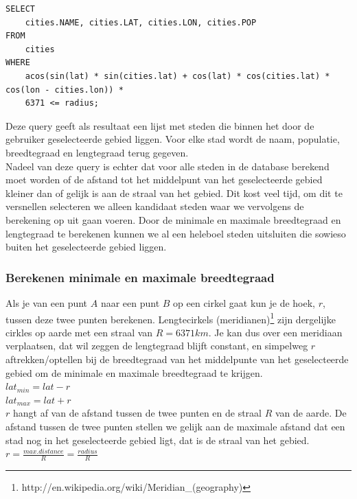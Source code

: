 \documentclass[twoside,openright]{uva-bachelor-thesis}
\begin{document}
\begin{verbatim}
SELECT
    cities.NAME, cities.LAT, cities.LON, cities.POP
FROM 
    cities 
WHERE 
    acos(sin(lat) * sin(cities.lat) + cos(lat) * cos(cities.lat) * cos(lon - cities.lon)) * 
    6371 <= radius;
\end{verbatim}
		Deze query geeft als resultaat een lijst met steden die binnen het door de gebruiker geselecteerde gebied liggen. Voor elke stad wordt de naam, populatie, breedtegraad en lengtegraad terug gegeven.
		\\[0.5cm]
		Nadeel van deze query is echter dat voor alle steden in de database berekend moet worden of de afstand tot het middelpunt van het geselecteerde gebied kleiner dan of gelijk is aan de straal van het gebied. Dit kost veel tijd, om dit te versnellen selecteren we alleen kandidaat steden waar we vervolgens de berekening op uit gaan voeren. Door de minimale en maximale breedtegraad en lengtegraad te berekenen kunnen we al een heleboel steden uitsluiten die sowieso buiten het geselecteerde gebied liggen.
		\subsubsection{Berekenen minimale en maximale breedtegraad}
		Als je van een punt $A$ naar een punt $B$ op een cirkel gaat kun je de hoek, $r$, tussen deze twee punten berekenen. Lengtecirkels (meridianen)\footnote{http://en.wikipedia.org/wiki/Meridian\_(geography)} zijn dergelijke cirkles op aarde met een straal van $R = 6371km$. Je kan dus over een meridiaan verplaatsen, dat wil zeggen de lengtegraad blijft constant, en simpelweg $r$ aftrekken/optellen bij de breedtegraad van het middelpunte van het geselecteerde gebied om de minimale en maximale breedtegraad te krijgen.
		\\[0.5cm]
		$lat_{min} = lat - r$ \\
		$lat_{max} = lat + r$
		\\[0.5cm]
		$r$ hangt af van de afstand tussen de twee punten en de straal $R$ van de aarde. De afstand tussen de twee punten stellen we gelijk aan de maximale afstand dat een stad nog in het geselecteerde gebied ligt, dat is de straal van het gebied.
		\\[0.5cm]
		$r = \frac{max. distance}{R} = \frac{radius}{R}$
\end{document}
